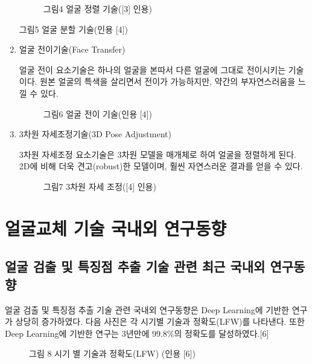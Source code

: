 \documentclass{oblivoir}
\begin{document}
\begin{enumerate}[가.]
\begin{figure}[h!]
    \centering
    \caption{그림4  얼굴 정렬 기술([3] 인용)}
\end{figure}

그림5  얼굴 분할 기술(인용 [4])

\item 얼굴 전이기술(Face Transfer)

얼굴 전이 요소기술은 하나의 얼굴을 본따서 다른 얼굴에 그대로 전이시키는 기술이다. 원본 얼굴의 특색을 살리면서 전이가 가능하지만, 약간의 부자연스러움을 느낄 수 있다.
\begin{figure}[h!]
    \centering
    \caption{그림6  얼굴 전이 기술(인용 [4])}
\end{figure}

\item  3차원 자세조정기술(3D Pose Adjustment)

3차원 자세조정 요소기술은 3차원 모델을 매개체로 하여 얼굴을 정렬하게 된다. 2D에 비해 더욱 견고(robust)한 모델이며, 훨씬 자연스러운 결과를 얻을 수 있다. 

\begin{figure}[h!]
    \centering
    \caption{그림7  3차원 자세 조정([4] 인용)}
\end{figure}

\end{enumerate}

\section{얼굴교체 기술 국내외 연구동향}

\subsection{얼굴 검출 및 특징점 추출 기술 관련 최근 국내외 연구동향}

얼굴 검출 및 특징점 추출 기술 관련 국내외 연구동향은 Deep Learning에 기반한 연구가 상당히 증가하였다. 다음 사진은 각 시기별 기술과 정확도(LFW)를 나타낸다. 또한 Deep Learning에 기반한 연구는 3년만에 99.8\%의 정확도를 달성하였다.[6]


\begin{figure}[h!]
    \centering
    \caption{그림 8  시기 별 기술과 정확도(LFW) (인용 [6])    }
\end{figure}
\end{document}

